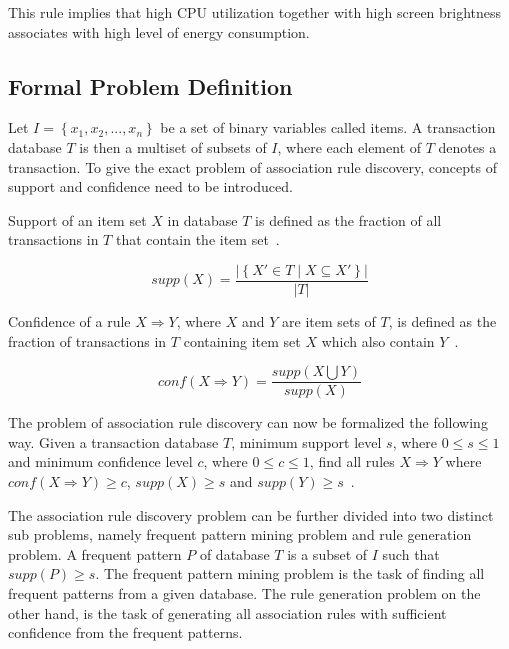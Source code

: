 This rule implies that high CPU utilization together with high screen brightness associates with high level of energy consumption.

\subsection{Formal Problem Definition}

Let $I = \left\{ x_1, x_2, ..., x_n \right\}$ be a set of binary variables called items. A transaction database $T$ is then a multiset of subsets of $I$, where each element of $T$ denotes a transaction. To give the exact problem of association rule discovery, concepts of support and confidence need to be introduced.

Support of an item set $X$ in database $T$ is defined as the fraction of all transactions in $T$ that contain the item set~\cite{Hipp:2000:AAR:360402.360421}.

\[ supp(X) = \dfrac{ \vert \left\{ X' \in T  \mid X \subseteq X'  \right\}  \vert }{ \vert T \vert  } \]

Confidence of a rule $X \Rightarrow Y$, where $X$ and $Y$ are item sets of $T$, is defined as the fraction of transactions in $T$ containing item set $X$ which also contain $Y$~\cite{Hipp:2000:AAR:360402.360421}.

\[conf( X \Rightarrow Y) = \dfrac{ supp( X \bigcup Y ) }{ supp(X) } \]

The problem of association rule discovery can now be formalized the following way. Given a transaction database $T$, minimum support level $s$, where $ 0 \leq s \leq 1 $ and minimum confidence level $c$, where $ 0 \leq c \leq 1 $, find all rules $X \Rightarrow Y$ where $conf( X \Rightarrow Y ) \geq c$, $supp(X) \geq s$ and $supp(Y) \geq s$~\cite{Hipp:2000:AAR:360402.360421}. 

The association rule discovery problem can be further divided into two distinct sub problems, namely frequent pattern mining problem and rule generation problem. A frequent pattern $P$ of database $T$ is a subset of $I$ such that $supp(P) \geq s$. The frequent pattern mining problem is the task of finding all frequent patterns from a given database. The rule generation problem on the other hand, is the task of generating all association rules with sufficient confidence from the frequent patterns. 

